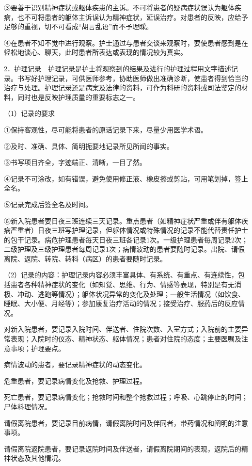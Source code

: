 ③要善于识别精神症状或躯体疾患的主诉。不可将患者的疑病症状误认为躯体疾病，也不可将患者的躯体主诉误认为精神症状，延误治疗。对患者的反映，应给予足够的重视，切不可看成“胡言乱语”而不予理睬。

④在患者不知不觉中进行观察。护士通过与患者交谈来观察时，要使患者感到是在轻松地谈心、聊天，此时患者所表达或表现的情况较为真实。

2．护理记录　护理记录是护士将观察到的结果及进行的护理过程用文字描述记录。书写好护理记录，可供医师参考，协助医师做出准确诊断，使患者得到恰当的治疗与处理。护理记录还是病案及法律的资料，可作为科研的资料或司法鉴定的材料，同时也是反映护理质量的重要标志之一。

（1）记录的要求

①保持客观性，尽可能将患者的原话记录下来，尽量少用医学术语。

②及时、准确、具体、简明扼要地记录所见所闻的事实。

③书写项目齐全，字迹端正、清晰，一目了然。

④记录不可涂改，如有错误，避免使用修正液、橡皮擦或剪贴，可用笔划掉，签上全名。

⑤记录完成后签全名及时间。

⑥新入院患者要日夜三班连续三天记录。重点患者（如精神症状严重或伴有躯体疾病严重者）日夜三班写护理记录，但躯体情况或特殊情况的记录不能代替责任护士的包干记录。病危护理患者每天日夜三班各记录1次。一级护理患者每周记录2次；二级护理及三级护理患者每周记录1次；病情波动的患者要随时记录。出院、请假离院、返院、转院、转科（病区）的患者要随时记录。

（2）记录的内容：护理记录内容必须丰富具体、有系统、有重点、有连续性，包括患者各种精神症状的变化（如知觉、思维、行为、情感等表现，特别是有无消极、冲动、逃跑等情况）；躯体状况异常的变化及处理；一般生活情况（如饮食、睡眠、大小便、月经等）；参加康复治疗活动的情况；接受治疗、服药后的反应情况。

对新入院患者，要记录入院时间、伴送者、住院次数、入室方式；入院前的主要异常表现；入院时的仪态、精神状态、躯体情况；患者对住院的态度；主要医嘱及注意事项；护理要点。

病情波动的患者，要记录精神症状的动态变化。

危重患者，要记录病情变化及抢救、护理过程。

死亡患者，要记录病情变化；抢救时间和整个抢救过程；呼吸、心跳停止的时间；尸体料理情况。

请假离院患者，要记录目前病情，请假离院时间及伴同者，带药情况和阐明的注意事项。

请假离院返院患者，要记录返院时间及伴送者，请假离院期间的表现，返院后的精神状态及其他情况。


